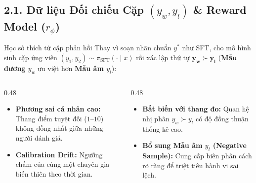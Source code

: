 
\subsection{2.1. Dữ liệu Đối chiếu Cặp \texorpdfstring{$(y_w, y_l)$}{(y\textunderscore w, y\textunderscore l)} \& Reward Model (\texorpdfstring{$r_\phi$}{r\textunderscore φ})}

\begin{frame}{Học sở thích từ cặp phản hồi}
  \small
  Thay vì soạn nhãn chuẩn $y^*$ như SFT, cho mô hình sinh cặp ứng viên $(y_1, y_2) \sim \pi_{\text{SFT}}(\cdot \mid x)$ rồi xác lập thứ tự $\mathbf{y_w \succ y_l}$ (\textbf{Mẫu dương $y_w$} ưu việt hơn \textbf{Mẫu âm $y_l$}):

  \vspace{0.08cm}
  \begin{columns}[T,onlytextwidth]
    \begin{column}{0.48\textwidth}
      \small
      \begin{itemize}\setlength{\itemsep}{4pt}
        \item \textbf{Phương sai cá nhân cao:} Thang điểm tuyệt đối ($1\text{--}10$) không đồng nhất giữa những người đánh giá.
        \item \textbf{Calibration Drift:} Ngưỡng chấm của cùng một chuyên gia biến thiên theo thời gian.
      \end{itemize}
    \end{column}
    \begin{column}{0.48\textwidth}
      \small
      \begin{itemize}\setlength{\itemsep}{4pt}
        \item \textbf{Bất biến với thang đo:} Quan hệ nhị phân $y_w \succ y_l$ có độ đồng thuận thống kê cao.
        \item \textbf{Bổ sung Mẫu âm $y_l$ (Negative Sample):} Cung cấp biên phân cách rõ ràng để triệt tiêu hành vi sai lệch.
      \end{itemize}
    \end{column}
  \end{columns}
  \par\vspace{0pt}
\end{frame}

